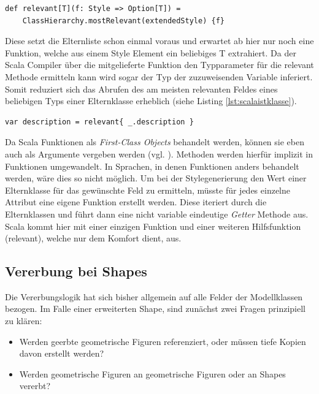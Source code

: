 \begin{lstlisting}[style=scala, caption = {Auszug aus Code Hilfsfunktion relevant}, label = {lst:defrelevant}]
def relevant[T](f: Style => Option[T]) =
    ClassHierarchy.mostRelevant(extendedStyle) {f}
\end{lstlisting}Diese setzt die Elternliste schon einmal voraus und erwartet ab hier nur noch eine Funktion, welche aus einem Style Element ein beliebiges T extrahiert.
Da der Scala Compiler über die mitgelieferte Funktion den Typparameter für die relevant Methode ermitteln kann wird sogar der Typ der zuzuweisenden Variable inferiert. Somit reduziert sich das Abrufen des am meisten relevanten Feldes eines beliebigen Typs einer Elternklasse erheblich (siehe Listing \ref{lst:scalaistklasse}).
\begin{lstlisting}[style=scala, caption = {Beispielaufruf um die latest-Bound description der Eterninstanzen zu ermitteln}, label = {lst:scalaistklasse}]
var description = relevant{ _.description }
\end{lstlisting}Da Scala Funktionen als \textit{First-Class Objects} behandelt werden, können sie eben auch als Argumente vergeben werden (vgl. ). Methoden werden hierfür implizit in Funktionen umgewandelt. In Sprachen, in denen Funktionen anders behandelt werden, wäre dies so nicht möglich. Um bei der Stylegenerierung den Wert einer Elternklasse für das gewünschte Feld zu ermitteln, müsste für jedes einzelne Attribut eine eigene Funktion erstellt werden. Diese iteriert durch die Elternklassen und führt dann eine nicht variable eindeutige \textit{Getter} Methode aus. Scala kommt hier mit einer einzigen Funktion und einer weiteren Hilfsfunktion (relevant), welche nur dem Komfort dient, aus.

\subsection{Vererbung bei Shapes}\label{shapeinheritance}Die Vererbungslogik hat sich bisher allgemein auf alle Felder der Modellklassen bezogen. Im Falle einer erweiterten Shape, sind zunächst zwei Fragen prinzipiell zu klären:
\begin{itemize}
\item Werden geerbte geometrische Figuren referenziert, oder müssen tiefe Kopien davon erstellt werden?
\item Werden geometrische Figuren an geometrische Figuren oder an Shapes vererbt?
\end{itemize}
